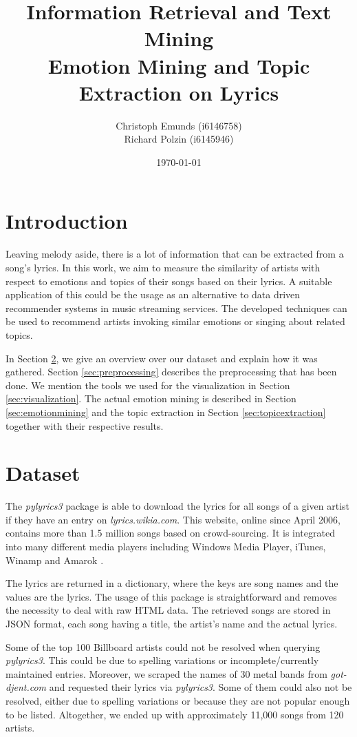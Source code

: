 \documentclass[10pt,a4paper]{article}
\author{Christoph Emunds (i6146758)\\Richard Polzin (i6145946)}
\title{Information Retrieval and Text Mining\\Emotion Mining and Topic Extraction on Lyrics}
\date{\today}
\begin{document}
	\maketitle
	
	\tableofcontents
	
	\section{Introduction}
	\label{sec:introduction}
	Leaving melody aside, there is a lot of information that can be extracted from a song's lyrics. In this work, we aim to measure the similarity of artists with respect to emotions and topics of their songs based on their lyrics. A suitable application of this could be the usage as an alternative to data driven recommender systems in music streaming services. The developed techniques can be used to recommend artists invoking similar emotions or singing about related topics.
	
	In Section \ref{sec:dataset}, we give an overview over our dataset and explain how it was gathered. Section \ref{sec:preprocessing} describes the preprocessing that has been done. We mention the tools we used for the visualization in Section \ref{sec:visualization}. The actual emotion mining is described in Section \ref{sec:emotionmining} and the topic extraction in Section \ref{sec:topicextraction} together with their respective results.

	\section{Dataset}
	\label{sec:dataset}

	The \textit{pylyrics3} package \cite{pylyrics3} is able to download the lyrics for all songs of a given artist if they have an entry on \textit{lyrics.wikia.com}. This website, online since April 2006, contains more than 1.5 million songs based on crowd-sourcing. It is integrated into many different media players including Windows Media Player, iTunes, Winamp and Amarok \cite{lyricwikia}.
	
	The lyrics are returned in a dictionary, where the keys are song names and the values are the lyrics. The usage of this package is straightforward and removes the necessity to deal with raw HTML data. The retrieved songs are stored in JSON format, each song having a title, the artist's name and the actual lyrics.
	
	Some of the top 100 Billboard artists could not be resolved when querying \textit{pylyrics3}. This could be due to spelling variations or incomplete/currently maintained entries. Moreover, we scraped the names of 30 metal bands from \textit{got-djent.com} and requested their lyrics via \textit{pylyrics3}. Some of them could also not be resolved, either due to spelling variations or because they are not popular enough to be listed. Altogether, we ended up with approximately 11,000 songs from 120 artists.
\end{document}
